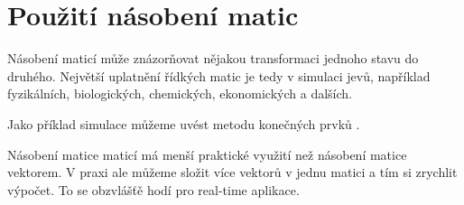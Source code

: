 
\section{Použití násobení matic}

Násobení maticí může znázorňovat nějakou transformaci jednoho stavu do druhého. Největší uplatnění řídkých matic je tedy v simulaci jevů, například fyzikálních, biologických, chemických, ekonomických a dalších. 

Jako příklad simulace můžeme uvést metodu konečných prvků \cite{4020926}\cite{0967-3334-30-6-S01}.



Násobení matice maticí má menší praktické využití než násobení matice vektorem. V praxi ale můžeme složit více vektorů v jednu matici a tím si zrychlit výpočet. To se obzvlášťě hodí pro real-time aplikace.




